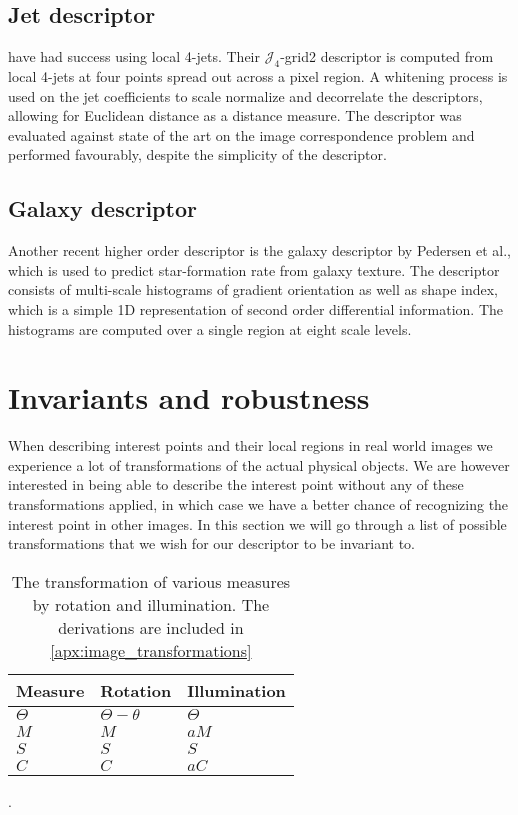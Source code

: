 \documentclass[thesis.tex]{subfiles}
\begin{document}
\subsection{Jet descriptor}

\cite{larsen2012jet} have had success using local 4-jets. Their
$\mathcal{J}_4$-grid2 descriptor is computed from local 4-jets at four points
spread out across a pixel region. A whitening process is used on the jet
coefficients to scale normalize and decorrelate the descriptors, allowing for
Euclidean distance as a distance measure. The descriptor was evaluated against
state of the art on the image correspondence problem and performed favourably,
despite the simplicity of the descriptor.

\subsection{Galaxy descriptor}

Another recent higher order descriptor is the galaxy descriptor by Pedersen
et al.\cite{pedersen2013shape}, which is used to predict star-formation
rate from galaxy texture. The descriptor consists of multi-scale histograms
of gradient orientation as well as shape index, which is a simple 1D
representation of second order differential information. The histograms are
computed over a single region at eight scale levels.


\section{Invariants and robustness}
When describing interest points and their local regions in real world images we experience a lot of transformations of the actual physical objects. We are however interested in being able to describe the interest point without any of these transformations applied, in which case we have a better chance of recognizing the interest point in other images. In this section we will go through a list of possible transformations that we wish for our descriptor to be invariant to.


\begin{table}
\centering
\begin{tabular}{@{}l|ll@{}}
Measure & Rotation & Illumination \\
\hline
$\Theta$ & $\Theta - \theta $ & $\Theta$ \\
$M$ & $M$ & $a M$ \\
$S$ & $S$ & $S$ \\
$C$ & $C$ & $a C$ \\
\end{tabular}
\caption{The transformation of various measures by rotation and illumination. The derivations are included in \cref{apx:image_transformations}}.
\end{table}
\end{document}
